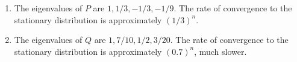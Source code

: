 \documentclass[12pt]{article}
\begin{document}
\begin{solution}
\begin{enumerate}[label=(\alph*)]
\[\begin{pmatrix}
                \frac{1}{10} & \frac{1}{2} & \frac{1}{2} & \frac{1}{10}\\
                \frac{1}{2} & \frac{9}{10} & \frac{9}{10} & \frac{1}{2}
            \end{pmatrix}
            .
        \] Since all entries are between \( 0 \) and \( 1 \), may as
        well choose \( s_{ij} =1 \), and the matrix above is the desired
        \( Q \).  Then the matrix for the Metropolis-Hastings algorithm
        is
        \[
            \begin{pmatrix}
                \frac{17}{40} & \frac{9}{40} & \frac{9}{40} & \frac{1}{8}\\
                \frac{1}{40} & \frac{33}{40} & \frac{1}{8} & \frac{1}{40}\\
                \frac{1}{40} & \frac{1}{8} & \frac{33}{40} & \frac{1}{40}\\
                \frac{1}{8} & \frac{9}{40} & \frac{9}{40} & \frac{17}{40}
            \end{pmatrix}
            .
        \] This has the same stationary distribution.
    \item
        The eigenvalues of \( P \) are \( 1, 1/3, -1/3, -1/9 \).  The
        rate of convergence to the stationary distribution is
        approximately \( (1/3)^n \).
    \item
        The eigenvalues of \( Q \) are \( 1, 7/10, 1/2, 3/20 \).  The
        rate of convergence to the stationary distribution is
        approximately \( (0.7)^n \), much slower.
\end{enumerate}
\end{solution}
\end{document}

